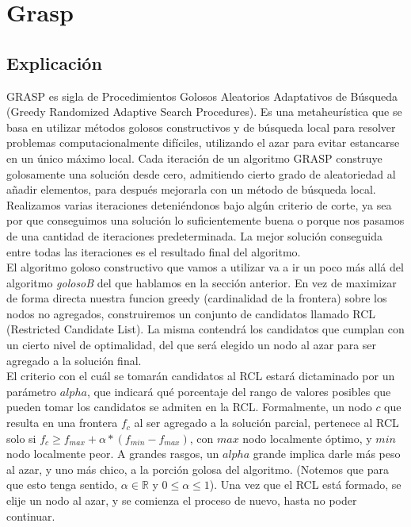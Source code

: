 \section{Grasp}

\subsection{Explicación}
GRASP es sigla de Procedimientos Golosos Aleatorios Adaptativos de Búsqueda (Greedy Randomized Adaptive Search Procedures). Es una metaheurística que se basa en utilizar métodos golosos constructivos y de búsqueda local para resolver problemas computacionalmente difíciles, utilizando el azar para evitar estancarse en un único máximo local. Cada iteración de un algoritmo GRASP construye golosamente una solución desde cero, admitiendo cierto grado de aleatoriedad al añadir elementos, para después mejorarla con un método de búsqueda local. Realizamos varias iteraciones deteniéndonos bajo algún criterio de corte, ya sea por que conseguimos una solución lo suficientemente buena o porque nos pasamos de una cantidad de iteraciones predeterminada. La mejor solución conseguida entre todas las iteraciones es el resultado final del algoritmo. \cite{paper_grasp} \\

El algoritmo goloso constructivo que vamos a utilizar va a ir un poco más allá del algoritmo \textit{golosoB} del que hablamos en la sección anterior. En vez de maximizar de forma directa nuestra funcion greedy (cardinalidad de la frontera) sobre los nodos no agregados, construiremos un conjunto de candidatos llamado RCL (Restricted Candidate List). La misma contendrá los candidatos que cumplan con un cierto nivel de optimalidad, del que será elegido un nodo al azar para ser agregado a la solución final. \\

El criterio con el cuál se tomarán candidatos al RCL estará dictaminado por un parámetro $alpha$, que indicará qué porcentaje del rango de valores posibles que pueden tomar los candidatos se admiten en la RCL. Formalmente, un nodo $c$ que resulta en una frontera $f_c$ al ser agregado a la solución parcial, pertenece al RCL solo si $f_c \geq f_{max} + \alpha * (f_{min} - f_{max})$, con $max$ nodo localmente óptimo, y $min$ nodo localmente peor. A grandes rasgos, un $alpha$ grande implica darle más peso al azar, y uno más chico, a la porción golosa del algoritmo. (Notemos que para que esto tenga sentido, $\alpha \in \mathbb{R}$ y $0 \leq \alpha \leq 1$). Una vez que el RCL está formado, se elije un nodo al azar, y se comienza el proceso de nuevo, hasta no poder continuar. \\

